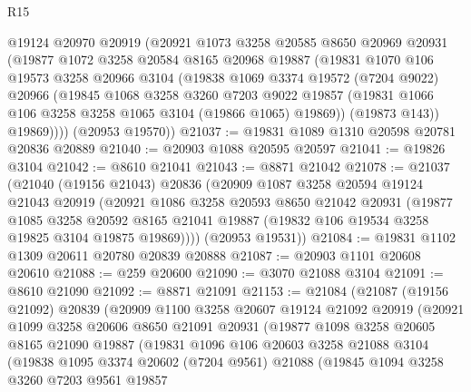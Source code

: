 \begin{lexlean}{R15}
\begin{coremodule}
        @19124
        @20970
        @20919
        (@20921
          @1073
          @3258
          @20585
          @8650
          @20969
          @20931
          (@19877
            @1072
            @3258
            @20584
            @8165
            @20968
            @19887
            (@19831
              @1070
              @106
              @19573
              @3258
              @20966
              @3104
              (@19838
                @1069
                @3374
                @19572
                (@7204 @9022)
                @20966
                (@19845
                  @1068
                  @3258
                  @3260
                  @7203
                  @9022
                  @19857
                  (@19831 @1066 @106 @3258 @3258 @1065 @3104 (@19866 @1065) @19869))
                (@19873 @143))
              @19869))))
      (@20953 @19570))
@21037 := @19831 @1089 @1310 @20598 @20781 @20836 @20889
@21040 := @20903 @1088 @20595 @20597
@21041 := @19826 @3104
@21042 := @8610 @21041
@21043 := @8871 @21042
@21078 := @21037
    (@21040
      (@19156 @21043)
      @20836
      (@20909
        @1087
        @3258
        @20594
        @19124
        @21043
        @20919
        (@20921
          @1086
          @3258
          @20593
          @8650
          @21042
          @20931
          (@19877
            @1085
            @3258
            @20592
            @8165
            @21041
            @19887
            (@19832 @106 @19534 @3258 @19825 @3104 @19875 @19869))))
      (@20953 @19531))
@21084 := @19831 @1102 @1309 @20611 @20780 @20839 @20888
@21087 := @20903 @1101 @20608 @20610
@21088 := @259 @20600
@21090 := @3070 @21088 @3104
@21091 := @8610 @21090
@21092 := @8871 @21091
@21153 := @21084
    (@21087
      (@19156 @21092)
      @20839
      (@20909
        @1100
        @3258
        @20607
        @19124
        @21092
        @20919
        (@20921
          @1099
          @3258
          @20606
          @8650
          @21091
          @20931
          (@19877
            @1098
            @3258
            @20605
            @8165
            @21090
            @19887
            (@19831
              @1096
              @106
              @20603
              @3258
              @21088
              @3104
              (@19838
                @1095
                @3374
                @20602
                (@7204 @9561)
                @21088
                (@19845
                  @1094
                  @3258
                  @3260
                  @7203
                  @9561
                  @19857

\end{coremodule}
\end{lexlean}
